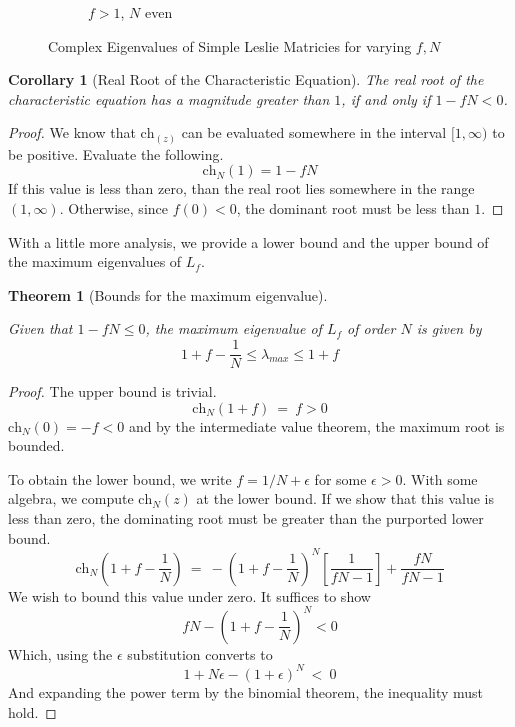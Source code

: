 \documentclass{article}
\newtheorem{theorem}{Theorem}[section]
\newtheorem{cor}{Corollary}[section]
\newtheorem{theorem}{Theorem}
\newtheorem{cor}{Corollary}
\numberwithin{equation}{section}
\newcommand{\ch}{\text{ch}}
\begin{document}
\begin{figure}[htp]
\begin{subfigure}[b]{0.45\textwidth}
        \caption{$f > 1$, $N$ even}
        \label{fig:fig4}
    \end{subfigure}
    \caption{Complex Eigenvalues of Simple Leslie Matricies for varying $f, N$}
    \label{fig:overall}
\end{figure}

\newpage

\begin{cor}[Real Root of the Characteristic Equation]

    The real root of the characteristic equation has a magnitude greater 
    than $1$, if and only if $1-fN < 0$. 
\end{cor}
\begin{proof}
    We know that $\ch_(z)$ can be evaluated somewhere in 
    the interval $[1, \infty)$ to be positive. 
    Evaluate the following. 
    \[
        \ch_N(1) = 1 - fN
    \]
    If this value is less than zero, than the real 
    root lies somewhere in the range $(1, \infty)$. 
    Otherwise, since $f(0) < 0$, the dominant root 
    must be less than $1$. 
\end{proof}



With a little more analysis, we provide a lower bound and the 
upper bound of the maximum eigenvalues of $L_f$. 

\begin{theorem}[Bounds for the maximum eigenvalue]\label{thm:Bound}

 Given that $1-fN \leq 0$, the maximum eigenvalue of $L_f$ of order 
 $N$ is given by 
 \[
 1 + f - \frac 1 {N} \leq \lambda_{max} \leq 1 + f
 \]
\end{theorem}

\begin{proof}
    The upper bound is trivial. 
    \[
        \ch_N(1+f) \ = \ f > 0
    \]  
    $\ch_N(0) = -f < 0$ and by the intermediate value theorem, the maximum root is 
    bounded. 

    To obtain the lower bound, we write $f = 1/N + \epsilon$ for 
    some $\epsilon > 0$. With some algebra, we compute $\ch_N(z)$ at the lower 
    bound. If we show that this value is less than zero, the 
    dominating root must be greater than the purported lower bound. 
    \[
        \ch_N\left(
            1 + f - \frac 1 N
        \right)  \ = \ -
        \left(
            1 + f - \frac 1 N
        \right)^N \left[
            \frac {1} {fN - 1}
        \right]
        + \frac {fN} {fN - 1}
    \]
    We wish to bound this value under zero. It suffices to show 
    \[
        fN - \left(
            1 + f - \frac 1 N
        \right)^N < 0
    \]
    Which, using the $\epsilon$ substitution converts to 
    \[
        1 + N\epsilon - (1 + \epsilon)^N \ < \ 0
    \]
    And expanding the power term by the binomial theorem, 
    the inequality must hold. 
\end{proof}
\end{document}
